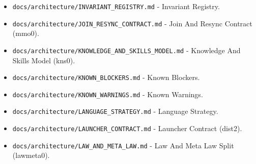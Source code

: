 \documentclass[9pt,a4paper,openany]{book}
\begin{document}
\begin{itemize}
\item \texttt{docs/\allowbreak{}architecture/\allowbreak{}INVARIANT\_\allowbreak{}REGISTRY.\allowbreak{}md} -\allowbreak{} Invariant Registry.\allowbreak{}
\end{itemize}

\begin{itemize}
\item \texttt{docs/\allowbreak{}architecture/\allowbreak{}JOIN\_\allowbreak{}RESYNC\_\allowbreak{}CONTRACT.\allowbreak{}md} -\allowbreak{} Join And Resync Contract (mmo0).\allowbreak{}
\end{itemize}

\begin{itemize}
\item \texttt{docs/\allowbreak{}architecture/\allowbreak{}KNOWLEDGE\_\allowbreak{}AND\_\allowbreak{}SKILLS\_\allowbreak{}MODEL.\allowbreak{}md} -\allowbreak{} Knowledge And Skills Model (kns0).\allowbreak{}
\end{itemize}

\begin{itemize}
\item \texttt{docs/\allowbreak{}architecture/\allowbreak{}KNOWN\_\allowbreak{}BLOCKERS.\allowbreak{}md} -\allowbreak{} Known Blockers.\allowbreak{}
\end{itemize}

\begin{itemize}
\item \texttt{docs/\allowbreak{}architecture/\allowbreak{}KNOWN\_\allowbreak{}WARNINGS.\allowbreak{}md} -\allowbreak{} Known Warnings.\allowbreak{}
\end{itemize}

\begin{itemize}
\item \texttt{docs/\allowbreak{}architecture/\allowbreak{}LANGUAGE\_\allowbreak{}STRATEGY.\allowbreak{}md} -\allowbreak{} Language Strategy.\allowbreak{}
\end{itemize}

\begin{itemize}
\item \texttt{docs/\allowbreak{}architecture/\allowbreak{}LAUNCHER\_\allowbreak{}CONTRACT.\allowbreak{}md} -\allowbreak{} Launcher Contract (dist2).\allowbreak{}
\end{itemize}

\begin{itemize}
\item \texttt{docs/\allowbreak{}architecture/\allowbreak{}LAW\_\allowbreak{}AND\_\allowbreak{}META\_\allowbreak{}LAW.\allowbreak{}md} -\allowbreak{} Law And Meta Law Split (lawmeta0).\allowbreak{}
\end{itemize}
\end{document}
